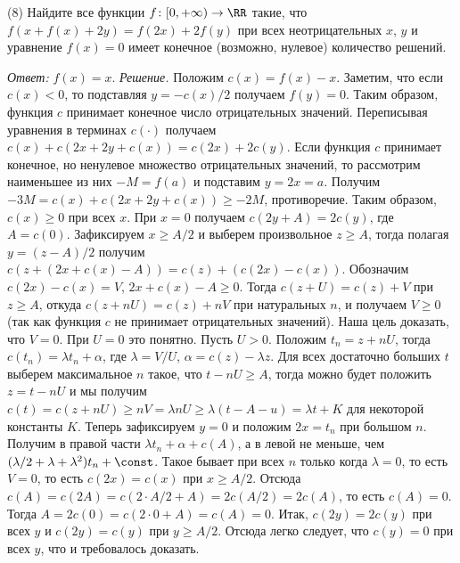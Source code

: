 \textsf{(8)}
Найдите все функции $f \colon [0, +\infty) \to \RR$ такие, что
$f(x + f(x) + 2 y) = f(2 x) + 2 f(y)$
при всех неотрицательных $x$, $y$ и уравнение $f(x) = 0$ имеет конечное
(возможно, нулевое) количество решений.

\solution
\emph{Ответ:}
$f(x) = x$.
\emph{Решение.}
Положим $c(x) = f(x) - x$.
Заметим, что если $c(x) < 0$, то подставляя $y = -c(x) / 2$ получаем
$f(y) = 0$.
Таким образом, функция $c$ принимает конечное число отрицательных значений.
Переписывая уравнения в терминах $c(\cdot)$ получаем
$c(x) + c(2 x + 2 y + c(x)) = c(2 x) + 2 c(y)$.
Если функция $c$ принимает конечное, но ненулевое множество отрицательных
значений, то рассмотрим наименьшее из них $-M = f(a)$ и подставим
$y = 2 x = a$.
Получим $- 3 M = c(x) + c(2 x + 2 y + c(x)) \geq -2 M$, противоречие.
Таким образом, $c(x) \geq 0$ при всех $x$.
При $x = 0$ получаем $c(2 y + A) = 2 c(y)$, где $A = c(0)$.
Зафиксируем $x \geq A / 2$ и выберем произвольное $z \geq A$, тогда полагая
$y = (z - A) / 2$ получим $c(z + (2 x + c(x) - A)) = c(z) + (c(2 x) - c(x))$.
Обозначим $c(2 x) - c(x) = V$, $2 x + c(x) - A \geq 0$.
Тогда $c(z + U) = c(z) + V$ при $z \geq A$, откуда $c(z + n U) = c(z) + n V$
при натуральных $n$, и получаем $V \geq 0$
(так как функция $c$ не принимает отрицательных значений).
Наша цель доказать, что $V = 0$.
При $U = 0$ это понятно.
Пусть $U > 0$.
Положим $t_n = z + n U$, тогда $c(t_n) = \lambda t_n + \alpha$, где
$\lambda = V / U$, $\alpha = c(z) - \lambda z$.
Для всех достаточно больших $t$ выберем максимальное $n$ такое, что
$t - n U \geq A$, тогда можно будет положить $z = t - n U$ и мы получим
\(
    c(t)
=
    c(z + n U)
\geq
    n V
=
    \lambda n U
\geq
    \lambda (t - A - u)
=
    \lambda t + K
\)
для некоторой константы $K$.
Теперь зафиксируем $y = 0$ и положим $2 x = t_n$ при большом $n$.
Получим в правой части $\lambda t_n + \alpha + c(A)$, а в левой не меньше, чем
$(\lambda / 2 + \lambda + \lambda^2) t_n + \const$.
Такое бывает при всех $n$ только когда $\lambda = 0$, то есть $V = 0$, то есть
$c(2 x) = c(x)$ при $x \geq A / 2$.
Отсюда
$c(A) = c(2 A) = c(2 \cdot A / 2 + A) = 2 c(A / 2) = 2 c(A)$,
то есть $c(A) = 0$.
Тогда $A = 2 c(0) = c(2 \cdot 0 + A) = c(A) = 0$.
Итак, $c(2 y) = 2 c(y)$ при всех $y$ и $c(2 y) = c(y)$ при $y \geq A / 2$.
Отсюда легко следует, что $c(y) = 0$ при всех $y$, что и требовалось доказать.

